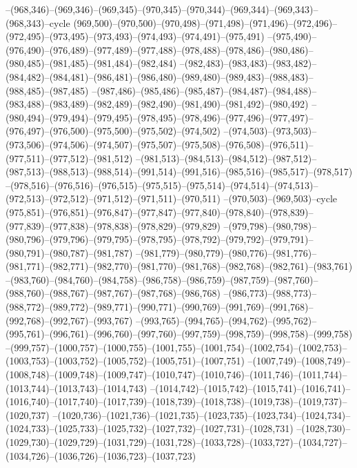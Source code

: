 --(968,346)--(969,346)--(969,345)--(970,345)--(970,344)--(969,344)--(969,343)--(968,343)--cycle
(969,500)--(970,500)--(970,498)--(971,498)--(971,496)--(972,496)--(972,495)--(973,495)--(973,493)--(974,493)--(974,491)--(975,491)
--(975,490)--(976,490)--(976,489)--(977,489)--(977,488)--(978,488)--(978,486)--(980,486)--(980,485)--(981,485)--(981,484)--(982,484)
--(982,483)--(983,483)--(983,482)--(984,482)--(984,481)--(986,481)--(986,480)--(989,480)--(989,483)--(988,483)--(988,485)--(987,485)
--(987,486)--(985,486)--(985,487)--(984,487)--(984,488)--(983,488)--(983,489)--(982,489)--(982,490)--(981,490)--(981,492)--(980,492)
--(980,494)--(979,494)--(979,495)--(978,495)--(978,496)--(977,496)--(977,497)--(976,497)--(976,500)--(975,500)--(975,502)--(974,502)
--(974,503)--(973,503)--(973,506)--(974,506)--(974,507)--(975,507)--(975,508)--(976,508)--(976,511)--(977,511)--(977,512)--(981,512)
--(981,513)--(984,513)--(984,512)--(987,512)--(987,513)--(988,513)--(988,514)--(991,514)--(991,516)--(985,516)--(985,517)--(978,517)
--(978,516)--(976,516)--(976,515)--(975,515)--(975,514)--(974,514)--(974,513)--(972,513)--(972,512)--(971,512)--(971,511)--(970,511)
--(970,503)--(969,503)--cycle
(975,851)--(976,851)--(976,847)--(977,847)--(977,840)--(978,840)--(978,839)--(977,839)--(977,838)--(978,838)--(978,829)--(979,829)
--(979,798)--(980,798)--(980,796)--(979,796)--(979,795)--(978,795)--(978,792)--(979,792)--(979,791)--(980,791)--(980,787)--(981,787)
--(981,779)--(980,779)--(980,776)--(981,776)--(981,771)--(982,771)--(982,770)--(981,770)--(981,768)--(982,768)--(982,761)--(983,761)
--(983,760)--(984,760)--(984,758)--(986,758)--(986,759)--(987,759)--(987,760)--(988,760)--(988,767)--(987,767)--(987,768)--(986,768)
--(986,773)--(988,773)--(988,772)--(989,772)--(989,771)--(990,771)--(990,769)--(991,769)--(991,768)--(992,768)--(992,767)--(993,767)
--(993,765)--(994,765)--(994,762)--(995,762)--(995,761)--(996,761)--(996,760)--(997,760)--(997,759)--(998,759)--(998,758)--(999,758)
--(999,757)--(1000,757)--(1000,755)--(1001,755)--(1001,754)--(1002,754)--(1002,753)--(1003,753)--(1003,752)--(1005,752)--(1005,751)--(1007,751)
--(1007,749)--(1008,749)--(1008,748)--(1009,748)--(1009,747)--(1010,747)--(1010,746)--(1011,746)--(1011,744)--(1013,744)--(1013,743)--(1014,743)
--(1014,742)--(1015,742)--(1015,741)--(1016,741)--(1016,740)--(1017,740)--(1017,739)--(1018,739)--(1018,738)--(1019,738)--(1019,737)--(1020,737)
--(1020,736)--(1021,736)--(1021,735)--(1023,735)--(1023,734)--(1024,734)--(1024,733)--(1025,733)--(1025,732)--(1027,732)--(1027,731)--(1028,731)
--(1028,730)--(1029,730)--(1029,729)--(1031,729)--(1031,728)--(1033,728)--(1033,727)--(1034,727)--(1034,726)--(1036,726)--(1036,723)--(1037,723)
